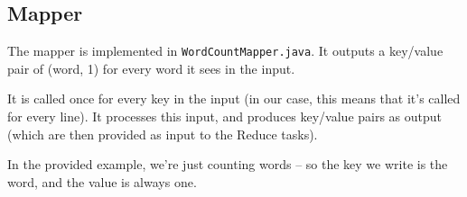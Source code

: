 \documentclass[a4paper,11pt]{article}
\begin{document}

 
  
  
    
  \subsection{Mapper}
 
  The mapper is implemented in \texttt{WordCountMapper.java}. It outputs a key/value pair of (word, 1) for every word it sees in the input.

  It is called once for every key in the input (in our case, this means that it's called for every line). It processes this input,
  and produces key/value pairs as output (which are then provided as input to the Reduce tasks).

  In the provided example, we're just counting words -- so the key we write is the word, and the value is always one.

  
  
\end{document}
